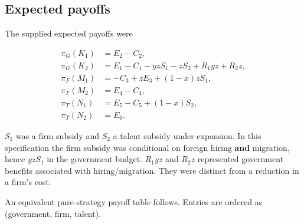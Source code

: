 \documentclass[
  11pt,
  letterpaper,
]{article}
\begin{document}
\subsection{Expected payoffs}\label{expected-payoffs}

The supplied expected payoffs were

\[
\begin{aligned}
\pi_G(K_1)&=E_2-C_2,\\
\pi_G(K_2)&=E_1-C_1-yzS_1-zS_2+R_1yz+R_2z,\\
\pi_F(M_1)&=-C_3+zE_3+(1-x)zS_1,\\
\pi_F(M_2)&=E_4-C_4,\\
\pi_T(N_1)&=E_5-C_5+(1-x)S_2,\\
\pi_T(N_2)&=E_6.
\end{aligned}
\]

\(S_1\) was a firm subsidy and \(S_2\) a talent subsidy under expansion.
In this specification the firm subsidy was conditional on foreign hiring
\textbf{and} migration, hence \(yzS_1\) in the government budget.
\(R_1yz\) and \(R_2z\) represented government benefits associated with
hiring/migration. They were distinct from a reduction in a firm's cost.

An equivalent pure-strategy payoff table follows. Entries are ordered as
(government, firm, talent).
\end{document}
